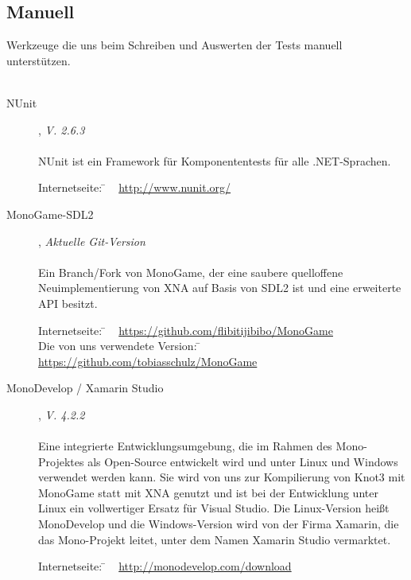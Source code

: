 \subsection{Manuell}
\label{Abschnitt:Programmfehler:Werkzeuge:Manuell}

Werkzeuge die uns beim Schreiben und Auswerten der Tests manuell unterstützen.
\\
\\

\begin{description}

	\item[NUnit], \textit{V. 2.6.3}\hfill
	\\
	\\
	NUnit ist ein Framework für Komponententests für alle .NET-Sprachen.
	
	\begin{tabbing}
		Internetseite:
		\= ~ \href {http://www.nunit.org/}
	    	       {http://www.nunit.org/}
	    \\
	\end{tabbing}
	
	\item[MonoGame-SDL2], \textit{Aktuelle Git-Version}\hfill
	\\
	\\
	Ein Branch/Fork von MonoGame, der eine saubere quelloffene Neuimplementierung von XNA auf Basis von SDL2 ist und eine erweiterte API besitzt.
	
	\begin{tabbing}
		Internetseite:
		\= ~ \href {https://github.com/flibitijibibo/MonoGame}
	    	       {https://github.com/flibitijibibo/MonoGame}
	    \\
		Die von uns verwendete Version:
		\= ~ \href {https://github.com/tobiasschulz/MonoGame}
	    	       {https://github.com/tobiasschulz/MonoGame}
	    \\
	\end{tabbing}
	
	\item[MonoDevelop / Xamarin Studio], \textit{V. 4.2.2}\hfill
	\\
	\\
	Eine integrierte Entwicklungsumgebung, die im Rahmen des Mono-Projektes als Open-Source entwickelt wird und unter Linux und Windows verwendet werden kann.
	Sie wird von uns zur Kompilierung von Knot3 mit MonoGame statt mit XNA genutzt und ist bei der Entwicklung unter Linux ein vollwertiger Ersatz für Visual Studio.
	Die Linux-Version heißt MonoDevelop und die Windows-Version wird von der Firma Xamarin, die das Mono-Projekt leitet, unter dem Namen Xamarin Studio vermarktet.
	
	\begin{tabbing}
		Internetseite:
		\= ~ \href {http://monodevelop.com/download}
	    	       {http://monodevelop.com/download}
	    \\
	\end{tabbing}
	
\end{description}

